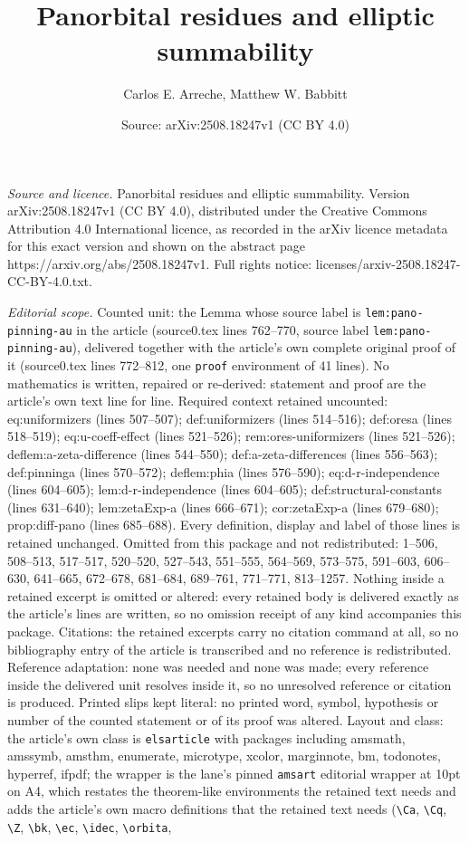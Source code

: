 \documentclass[10pt,a4paper]{amsart}
\title[Panorbital residues and elliptic summability]{Panorbital residues and elliptic summability}
\author{Carlos E. Arreche, Matthew W. Babbitt}
\date{Source: arXiv:2508.18247v1 (CC BY 4.0)}
\begin{document}
\maketitle

\noindent\emph{Source and licence.} Panorbital residues and elliptic summability. Version arXiv:2508.18247v1 (CC BY 4.0), distributed under the Creative Commons Attribution 4.0 International licence, as recorded in the arXiv licence metadata for this exact version and shown on the abstract page https://arxiv.org/abs/2508.18247v1. Full rights notice: licenses/arxiv-2508.18247-CC-BY-4.0.txt.\par\smallskip

\noindent\textit{Editorial scope.} Counted unit: the Lemma whose source label is \texttt{lem:pano-pinning-au} in the article (source0.tex lines 762--770, source label \texttt{lem:pano-pinning-au}), delivered together with the article's own complete original proof of it (source0.tex lines 772--812, one \texttt{proof} environment of 41 lines). No mathematics is written, repaired or re-derived: statement and proof are the article's own text line for line. Required context retained uncounted: eq:uniformizers (lines 507--507); def:uniformizers (lines 514--516); def:oresa (lines 518--519); eq:u-coeff-effect (lines 521--526); rem:ores-uniformizers (lines 521--526); deflem:a-zeta-difference (lines 544--550); def:a-zeta-differences (lines 556--563); def:pinninga (lines 570--572); deflem:phia (lines 576--590); eq:d-r-independence (lines 604--605); lem:d-r-independence (lines 604--605); def:structural-constants (lines 631--640); lem:zetaExp-a (lines 666--671); cor:zetaExp-a (lines 679--680); prop:diff-pano (lines 685--688). Every definition, display and label of those lines is retained unchanged. Omitted from this package and not redistributed: 1--506, 508--513, 517--517, 520--520, 527--543, 551--555, 564--569, 573--575, 591--603, 606--630, 641--665, 672--678, 681--684, 689--761, 771--771, 813--1257. Nothing inside a retained excerpt is omitted or altered: every retained body is delivered exactly as the article's lines are written, so no omission receipt of any kind accompanies this package. Citations: the retained excerpts carry no citation command at all, so no bibliography entry of the article is transcribed and no reference is redistributed. Reference adaptation: none was needed and none was made; every reference inside the delivered unit resolves inside it, so no unresolved reference or citation is produced. Printed slips kept literal: no printed word, symbol, hypothesis or number of the counted statement or of its proof was altered. Layout and class: the article's own class is \texttt{elsarticle} with packages including amsmath, amssymb, amsthm, enumerate, microtype, xcolor, marginnote, bm, todonotes, hyperref, ifpdf; the wrapper is the lane's pinned \texttt{amsart} editorial wrapper at 10pt on A4, which restates the theorem-like environments the retained text needs and adds the article's own macro definitions that the retained text needs (\texttt{\textbackslash Ca}, \texttt{\textbackslash Cq}, \texttt{\textbackslash Z}, \texttt{\textbackslash bk}, \texttt{\textbackslash ec}, \texttt{\textbackslash idec}, \texttt{\textbackslash orbita}, 
\end{document}
